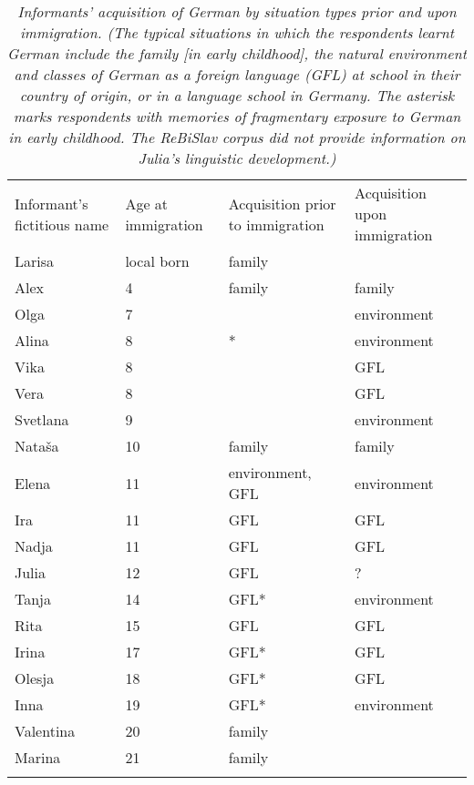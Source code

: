 \begin{table} 
\begin{small}
		\begin{tabular}{p{7em}<{\raggedright}p{7em}<{\raggedright}p{7.5em}<{\raggedright}p{7em}<{\raggedright}} \midrule
			\addlinespace[2mm]
		
			Informant's fictitious name & Age at immigration & Acquisition prior to immigration & Acquisition upon immigration \\ \addlinespace[2mm] \midrule
			\addlinespace[2mm]
		Larisa & local born & family & \\
		Alex & 4 & family & family\\
		Olga & 7 & & environment\\
		Alina & 8 & * & environment\\
		Vika & 8 & & GFL\\
		Vera & 8 & & GFL\\	
		Svetlana & 9 & & environment\\
		Nataša & 10 & family & family\\
		Elena & 11 & environment, GFL & environment\\
		Ira & 11 & GFL & GFL \\
		Nadja & 11 & GFL & GFL \\
		Julia & 12 & GFL & ?\\
		Tanja & 14 & GFL* & environment\\
		Rita & 15 & GFL & GFL\\
		Irina & 17 & GFL* & GFL\\
		Olesja & 18 & GFL* & GFL\\
		Inna & 19 & GFL* & environment\\
		Valentina & 20 & family & \\
		Marina & 21 & family & \\
		\addlinespace[2mm]
		\midrule
	\end{tabular}
\end{small}
	\vspace{3mm}
	\caption{\textit{Informants' acquisition of German by situation types prior and upon immigration. (The typical situations in which the respondents learnt German include the family [in early childhood], the natural environment and classes of German as a foreign language (GFL) at school in their country of origin, or in a language school in Germany. The asterisk marks respondents with memories of fragmentary exposure to German in early childhood. The ReBiSlav corpus did not provide information on Julia's linguistic development.)}}\label{tab:3:4}
\end{table}

